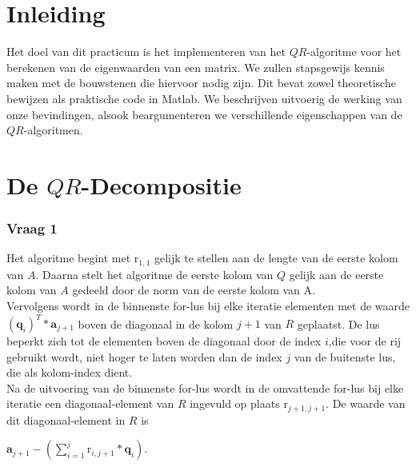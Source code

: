 \documentclass{article}
\begin{document}
\tableofcontents
\newpage
\section*{Inleiding}
Het doel van dit practicum is het implementeren van het $QR$-algoritme voor het berekenen van de eigenwaarden van een matrix. We zullen stapsgewijs kennis maken met de bouwstenen die hiervoor nodig zijn. Dit bevat zowel theoretische bewijzen als praktische code in Matlab. We beschrijven uitvoerig de werking van onze bevindingen, alsook beargumenteren we verschillende eigenschappen van de $QR$-algoritmen.

\newpage


\section{De $QR$-Decompositie}

\subsubsection*{Vraag 1}

Het algoritme begint met $\text{r}_{1,1}$ gelijk te stellen aan de lengte van de eerste kolom van $A$.
Daarna stelt het algoritme de eerste kolom van $Q$ gelijk aan de eerste kolom van $A$ gedeeld door de norm van de eerste kolom van A.\\

Vervolgens wordt in de binnenste for-lus bij elke iteratie elementen met de waarde $(\mathbf{q}_i)^T * \mathbf{a}_{j+1}$ boven de diagonaal in de kolom $j+1$ van $R$ geplaatst. De lus beperkt zich tot de elementen boven de diagonaal door de index $i$,die voor de rij gebruikt wordt, niet hoger te laten worden dan de index $j$ van de buitenste lus, die als kolom-index dient.\\

Na de uitvoering van de binnenste for-lus wordt in de omvattende for-lus bij elke iteratie een diagonaal-element van $R$ ingevuld op plaats $\text{r}_{j+1,j+1}$. De waarde van dit diagonaal-element in $R$ is 
\begin{center}
$\mathbf{a}_{j+1} - (\sum\limits_{i=1}^j \text{r}_{i,j+1} * \mathbf{q}_i)$.
\end{center}
\end{document}
